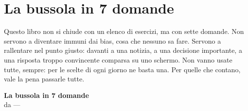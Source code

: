 
\chapter{La bussola in 7 domande}
\label{app:bussola}

Questo libro non si chiude con un elenco di esercizi, ma con sette domande. Non servono a diventare immuni dai bias, cosa che nessuno sa fare. Servono a rallentare nel punto giusto: davanti a una notizia, a una decisione importante, a una risposta troppo convincente comparsa su uno schermo. Non vanno usate tutte, sempre: per le scelte di ogni giorno ne basta una. Per quelle che contano, vale la pena passarle tutte.

\vspace{1em}

\begin{tcolorbox}[enhanced, colback=white, colframe=modernblack, boxrule=1pt, arc=2mm, left=10pt, right=10pt, top=8pt, bottom=8pt]
\begin{center}
{\sffamily\Large\bfseries La bussola in 7 domande}\\[0.3em]
{\sffamily\small\color{moderngray}da \textit{\booktitle} --- \authorname}
\end{center}
\vspace{0.4em}

\end{tcolorbox}

\vspace{1em}

